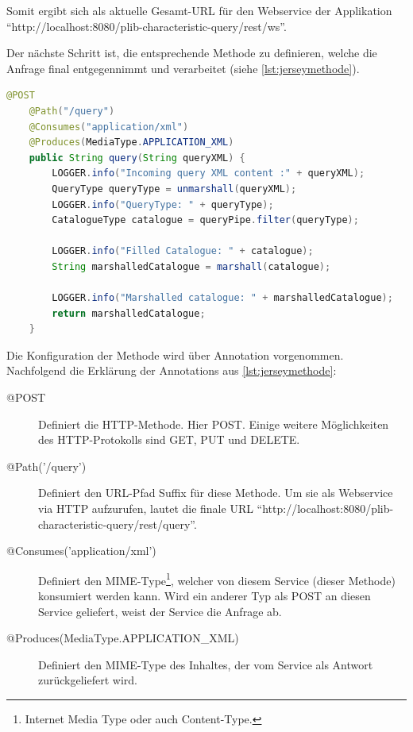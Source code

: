 Somit ergibt sich als aktuelle Gesamt-\gls{URL} für den \gls{Webservice} der Applikation \\  \enquote{http://localhost:8080/plib-characteristic-query/rest/ws}.
 
Der nächste Schritt ist, die entsprechende Methode zu definieren, welche die Anfrage final entgegennimmt und verarbeitet (siehe \autoref{lst:jerseymethode}). 
 
  \begin{lstlisting}[caption=Jersey Methode, language=Java, label=lst:jerseymethode]
    @POST
    @Path("/query")
    @Consumes("application/xml")
    @Produces(MediaType.APPLICATION_XML)
    public String query(String queryXML) {
        LOGGER.info("Incoming query XML content :" + queryXML);
        QueryType queryType = unmarshall(queryXML);
        LOGGER.info("QueryType: " + queryType);
        CatalogueType catalogue = queryPipe.filter(queryType);

        LOGGER.info("Filled Catalogue: " + catalogue);
        String marshalledCatalogue = marshall(catalogue);

        LOGGER.info("Marshalled catalogue: " + marshalledCatalogue);
        return marshalledCatalogue;
    }
 \end{lstlisting}  

Die Konfiguration der Methode wird über \Gls{Annotation} vorgenommen. Nachfolgend die Erklärung der \Glspl{Annotation} aus \autoref{lst:jerseymethode}:

\begin{description}
\item[@POST] Definiert die \gls{HTTP-Methode}. Hier \gls{POST}. Einige weitere Möglichkeiten des \gls{HTTP}-Protokolls sind GET, PUT und DELETE.
\item[@Path('/query')] Definiert den URL-Pfad Suffix für diese Methode. Um sie als \gls{Webservice} via \gls{HTTP} aufzurufen, lautet die finale URL \enquote{http://localhost:8080/plib-characteristic-query/rest/query}. 
\item[@Consumes('application/xml')] Definiert den \gls{MIME-Type}\footnote{Internet Media Type oder auch Content-Type.}, welcher von diesem Service (dieser Methode) konsumiert werden kann. Wird ein anderer Typ als POST an diesen Service geliefert, weist der Service die Anfrage ab. 
\item[@Produces(MediaType.APPLICATION\_XML)] Definiert den \gls{MIME-Type} des Inhaltes, der vom Service als Antwort zurückgeliefert wird.  
\end{description}

